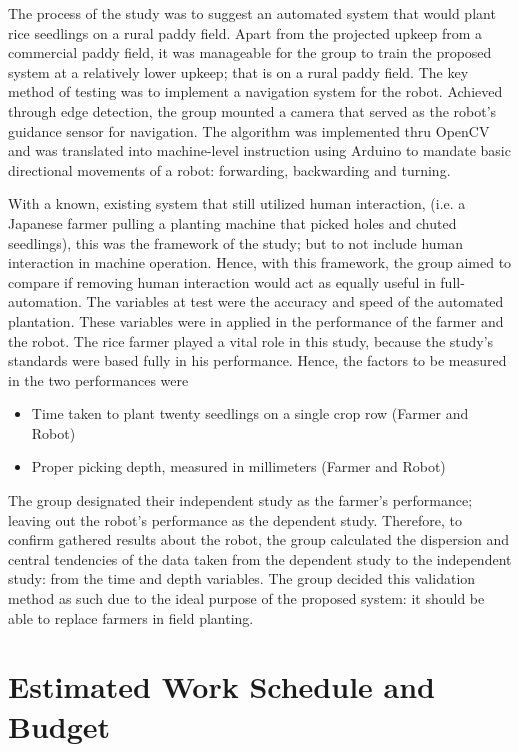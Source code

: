     The process of the study was to suggest an automated system that would plant rice seedlings on a rural paddy field. Apart from the projected upkeep from a commercial paddy field, it was manageable for the group to train the proposed system at a relatively lower upkeep; that is on a rural paddy field. The key method of testing was to implement a navigation system for the robot. Achieved through edge detection, the group mounted a camera that served as the robot’s guidance sensor for navigation. The algorithm was implemented thru OpenCV and was translated into machine-level instruction using Arduino to mandate basic directional movements of a robot: forwarding, backwarding and turning.
 
    With a known, existing system that still utilized human interaction, (i.e. a Japanese farmer pulling a planting machine that picked holes and chuted seedlings), this was the framework of the study; but to not include human interaction in machine operation. Hence, with this framework, the group aimed to compare if removing human interaction would act as equally useful in full-automation. The variables at test were the accuracy and speed of the automated plantation. These variables were in applied in the performance of the farmer and the robot. The rice farmer played a vital role in this study, because the study’s standards were based fully in his performance. Hence, the factors to be measured in the two performances were
\begin{itemize}
\item Time taken to plant twenty seedlings on a single crop row (Farmer and Robot)
\item Proper picking depth, measured in millimeters (Farmer and Robot)
\end{itemize}
 
    The group designated their independent study as the farmer’s performance; leaving out the robot’s performance as the dependent study. Therefore, to confirm gathered results about the robot, the group calculated the dispersion and central tendencies of the data taken from the dependent study to the independent study: from the time and depth variables. The group decided this validation method as such due to the ideal purpose of the proposed system: it should be able to replace farmers in field planting.
 

\section{Estimated Work Schedule and Budget}

